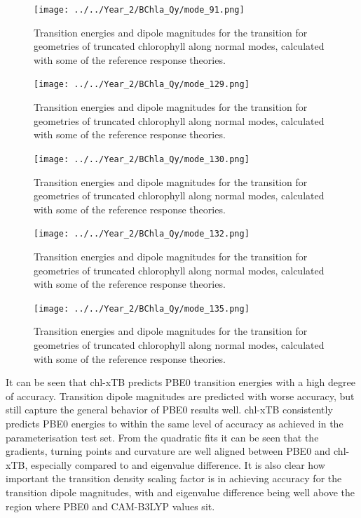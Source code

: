 \begin{figure}
    \centering
    \texttt{[image: ../../Year\_2/BChla\_Qy/mode\_91.png]}
    \label{fig:mode_91}
    \caption{Transition energies and dipole magnitudes for the \Qy transition for
    geometries of truncated chlorophyll along normal modes, calculated with some 
    of the reference response theories.}
\end{figure}

\begin{figure}
    \centering
    \texttt{[image: ../../Year\_2/BChla\_Qy/mode\_129.png]}
    \label{fig:mode_129}
    \caption{Transition energies and dipole magnitudes for the \Qy transition for
    geometries of truncated chlorophyll along normal modes, calculated with some 
    of the reference response theories.}
\end{figure}

\begin{figure}
    \centering
    \texttt{[image: ../../Year\_2/BChla\_Qy/mode\_130.png]}
    \label{fig:mode_130}
    \caption{Transition energies and dipole magnitudes for the \Qy transition for
    geometries of truncated chlorophyll along normal modes, calculated with some 
    of the reference response theories.}
\end{figure}

\begin{figure}
    \centering
    \texttt{[image: ../../Year\_2/BChla\_Qy/mode\_132.png]}
    \label{fig:mode_132}
    \caption{Transition energies and dipole magnitudes for the \Qy transition for
    geometries of truncated chlorophyll along normal modes, calculated with some 
    of the reference response theories.}
\end{figure}

\begin{figure}
    \centering
    \texttt{[image: ../../Year\_2/BChla\_Qy/mode\_135.png]}
    \label{fig:mode_135}
    \caption{Transition energies and dipole magnitudes for the \Qy transition for
    geometries of truncated chlorophyll along normal modes, calculated with some 
    of the reference response theories.}
\end{figure}

It can be seen that chl-xTB predicts PBE0 transition energies with a high degree
of accuracy. Transition dipole magnitudes are predicted with worse accuracy, but
still capture the general behavior of PBE0 results well. chl-xTB consistently 
predicts PBE0 energies to within the same level of accuracy as achieved in the 
parameterisation test set. From the quadratic fits it can be seen that the gradients, 
turning points and curvature are well aligned between PBE0 and chl-xTB, especially
compared to \dscf and eigenvalue difference. It is also clear how important the
transition density scaling factor is in achieving accuracy for the transition dipole
magnitudes, with \dscf and eigenvalue difference being well above the region where
PBE0 and CAM-B3LYP values sit.

